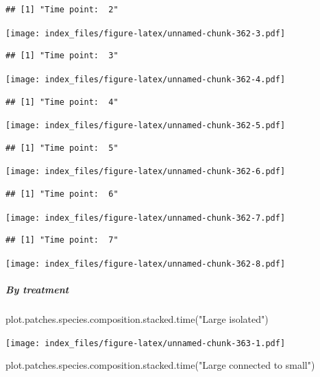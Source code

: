 \documentclass[
]{article}
\newenvironment{Shaded}{\begin{snugshade}}{\end{snugshade}}
\newcommand{\FunctionTok}[1]{\textcolor[rgb]{0.00,0.00,0.00}{#1}}
\newcommand{\NormalTok}[1]{#1}
\newcommand{\StringTok}[1]{\textcolor[rgb]{0.31,0.60,0.02}{#1}}
\begin{document}
\begin{verbatim}
## [1] "Time point:  2"
\end{verbatim}

\texttt{[image: index\_files/figure-latex/unnamed-chunk-362-3.pdf]}

\begin{verbatim}
## [1] "Time point:  3"
\end{verbatim}

\texttt{[image: index\_files/figure-latex/unnamed-chunk-362-4.pdf]}

\begin{verbatim}
## [1] "Time point:  4"
\end{verbatim}

\texttt{[image: index\_files/figure-latex/unnamed-chunk-362-5.pdf]}

\begin{verbatim}
## [1] "Time point:  5"
\end{verbatim}

\texttt{[image: index\_files/figure-latex/unnamed-chunk-362-6.pdf]}

\begin{verbatim}
## [1] "Time point:  6"
\end{verbatim}

\texttt{[image: index\_files/figure-latex/unnamed-chunk-362-7.pdf]}

\begin{verbatim}
## [1] "Time point:  7"
\end{verbatim}

\texttt{[image: index\_files/figure-latex/unnamed-chunk-362-8.pdf]}

\hypertarget{by-treatment-1}{%
\subparagraph{By treatment}\label{by-treatment-1}}

\begin{Shaded}
\begin{Highlighting}[]
\FunctionTok{plot.patches.species.composition.stacked.time}\NormalTok{(}\StringTok{"Large isolated"}\NormalTok{)}
\end{Highlighting}
\end{Shaded}

\texttt{[image: index\_files/figure-latex/unnamed-chunk-363-1.pdf]}

\begin{Shaded}
\begin{Highlighting}[]
\FunctionTok{plot.patches.species.composition.stacked.time}\NormalTok{(}\StringTok{"Large connected to small"}\NormalTok{)}
\end{Highlighting}
\end{Shaded}
\end{document}
